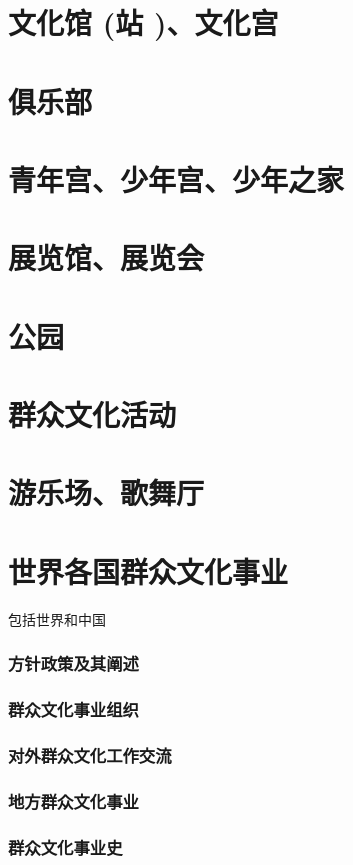 \documentclass[UTF8]{../../ApplicationUniverse}
\begin{document}
\section{文化馆 (站 )、文化宫}
\section{俱乐部}
\section{青年宫、少年宫、少年之家}
\section{展览馆、展览会}
\section{公园}
\section{群众文化活动}
\section{游乐场、歌舞厅}

\section{世界各国群众文化事业}

    包括世界和中国
    \subsubsection{方针政策及其阐述}
    \subsubsection{群众文化事业组织}
    \subsubsection{对外群众文化工作交流}
    \subsubsection{地方群众文化事业}
    \subsubsection{群众文化事业史}
\end{document}
